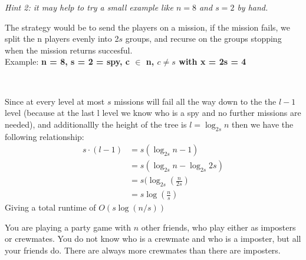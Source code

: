 \documentclass[11pt]{article}
\begin{document}
\emph{Hint 2: it may help to try a small example like $n=8$ and $s=2$ by hand.}\\
\begin{solution}
    The strategy would be to send the players on a mission, if the mission fails, we split the n players evenly into 2$s$ groups, and recurse on the groups stopping when the mission returns succesful.
    \\ Example: \textbf{n = 8, s = 2 = spy, c $\in$ n, $c \ne s$ with x = 2s = 4}
    \begin{center}
         \\
    \end{center}
    Since at every level at most $s$ missions will fail all the way down to the the $l-1$ level (because at the last l level we know who is a spy and no further missions are needed), 
    and additionallly the height of the tree is $l = \log_{2s}n$ then we have the following relationship:
    \begin{align*}
        s\cdot(l-1) &= s(\log_{2s}n - 1)\\
        &= s(\log_{2s}n - \log_{2s}2s)\\
        &= s(\log_{2s}\left(\frac{n}{2s}\right)\\
        &= s\log\left(\frac{n}{s}\right)
    \end{align*}
    Giving a total runtime of $O(s\log(n/s))$
\end{solution}

\newpage

You are playing a party game with $n$ other friends, who play either as imposters or crewmates.
You do not know who is a crewmate and who is a imposter, but all your friends do.
There are always more crewmates than there are imposters.
\end{document}
